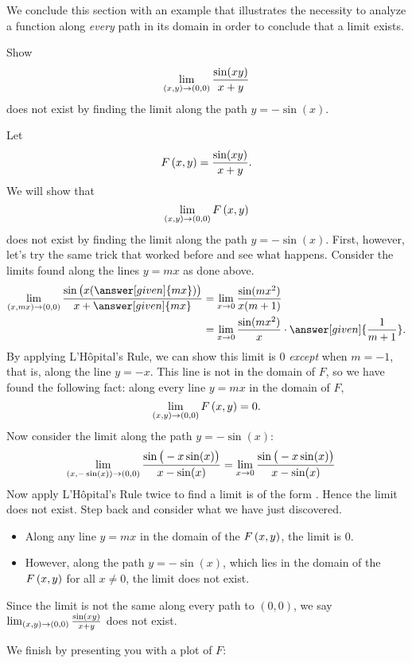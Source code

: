 \documentclass{ximera}
\begin{document}
We conclude this section with an example that illustrates the necessity to analyze a function along \emph{every} path in its domain in order to conclude that a limit exists.

\begin{example} 
  Show
  \[
  \lim_{\left(x,y\right)\to\left(0,0\right)} \frac{\sin(xy)}{x+y}
  \]
  does not exist by finding the limit along the path $y=-\sin(x)$.
  \begin{explanation}
    Let
    \[
    F\left(x,y\right) = \frac{\sin(xy)}{x+y}.
    \]
    We will show that
    \[
    \lim_{\left(x,y\right)\to\left(0,0\right)} F\left(x,y\right)
    \]
    does not exist by finding the limit along the path
    $y=-\sin(x)$. First, however, let's try the same trick that worked
    before and see what happens. Consider the limits found along the
    lines $y=mx$ as done above.
    \begin{align*}
      \lim_{\point{x,mx}\to\point{0,0}} \frac{\sin\big(x(\answer[given]{mx})\big)}{x+\answer[given]{mx}} &= \lim_{x\to 0} \frac{\sin (mx^2)}{x(m+1)} \\
      &= \lim_{x\to 0} \frac{\sin(mx^2)}{x}\cdot\answer[given]{\frac{1}{m+1}}.
    \end{align*}
    By applying L'H\^opital's Rule, we can show this limit is $0$
    \emph{except} when $m=-1$, that is, along the line $y=-x$. This
    line is not in the domain of $F$, so we have found the following
    fact: along every line $y=mx$ in the domain of $F$,
    \[
    \lim_{\left(x,y\right)\to\left(0,0\right)} F\left(x,y\right)=0.
    \]
    Now consider the limit along the path $y=-\sin(x)$:
    \begin{align*}
      \lim_{\left(x,-\sin(x)\right)\to\left(0,0\right)} \frac{\sin\big(-x\sin(x)\big)}{x-\sin(x)} &= \lim_{x\to0} \frac{\sin\big(-x\sin(x)\big)}{x-\sin(x)}
    \end{align*}
    Now apply L'H\^opital's Rule twice to find a limit is of the form
    \numOverZero.  Hence the limit does not exist.  Step back and
    consider what we have just discovered.
    \begin{itemize}
    \item Along any line $y=mx$ in the domain of the $F\left(x,y\right)$, the
      limit is $0$.
    \item However, along the path $y=-\sin(x)$, which lies in the
      domain of the $F\left(x,y\right)$ for all $x\neq 0$, the limit does not
      exist.
    \end{itemize}
    Since the limit is not the same along every path to $(0,0)$, we say
    $\lim_{\left(x,y\right)\to\left(0,0\right)}\frac{\sin(xy)}{x+y}$ does not exist.
    \begin{onlineOnly}
      We finish by presenting you with a plot of $F$:
      \begin{center}
      \end{center}
    \end{onlineOnly}
  \end{explanation}
\end{example}
\end{document}
